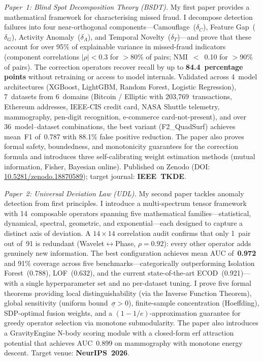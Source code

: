 \documentclass[12pt,a4paper]{article}
\begin{document}
\textit{Paper~1: Blind Spot Decomposition Theory (BSDT).}\;
My first paper provides a mathematical framework for characterising
missed fraud.  I decompose detection failures into four near-orthogonal
components---Camouflage~($\delta_C$), Feature Gap~($\delta_G$), Activity
Anomaly~($\delta_A$), and Temporal Novelty~($\delta_T$)---and prove that
these account for over 95\% of explainable variance in missed-fraud
indicators (component correlations $|\rho|<0.3$ for $>$80\% of pairs;
NMI~$<$~0.10 for $>$90\% of pairs).  The correction operators recover
recall by up to \textbf{84.4~percentage points} without retraining or
access to model internals.  Validated across 4~model architectures
(XGBoost, LightGBM, Random Forest, Logistic Regression), 7~datasets
from 6~domains (Bitcoin / Elliptic with 203,769~transactions, Ethereum
addresses, IEEE-CIS credit card, NASA Shuttle telemetry, mammography,
pen-digit recognition, e-commerce card-not-present), and over
36~model--dataset combinations, the best variant (F2\_QuadSurf) achieves
mean~F1 of~0.787 with 88.1\% false positive reduction.  The paper also
proves formal safety, boundedness, and monotonicity guarantees for the
correction formula and introduces three self-calibrating weight estimation
methods (mutual information, Fisher, Bayesian online).
Published on Zenodo (DOI:\,\href{https://doi.org/10.5281/zenodo.18870589}{10.5281/zenodo.18870589});
target journal: \textbf{IEEE~TKDE}.

\textit{Paper~2: Universal Deviation Law (UDL).}\;
My second paper tackles anomaly detection from first principles.
I introduce a multi-spectrum tensor framework with 14~composable
operators spanning five mathematical families---statistical, dynamical,
spectral, geometric, and exponential---each designed to capture a
distinct axis of deviation.  A $14\times14$ correlation audit confirms
that only 1~pair out of~91 is redundant (Wavelet$\leftrightarrow$Phase,
$\rho=0.92$): every other operator adds genuinely new information.
The best configuration achieves mean AUC of~\textbf{0.972} and 91\%
coverage across five benchmarks---categorically outperforming Isolation
Forest~(0.788), LOF~(0.632), and the current state-of-the-art
ECOD~(0.921)---with a single hyperparameter set and no per-dataset
tuning.  I prove five formal theorems providing local distinguishability
(via the Inverse Function Theorem), global sensitivity (uniform
bound~$\underline\sigma>0$), finite-sample concentration (Hoeffding),
SDP-optimal fusion weights, and a $(1-1/e)$-approximation guarantee for
greedy operator selection via monotone submodularity.  The paper also
introduces a GravityEngine N-body scoring module with a closed-form
erf attraction potential that achieves AUC~0.899 on mammography with
monotone energy descent.
Target venue: \textbf{NeurIPS~2026}.
\end{document}
